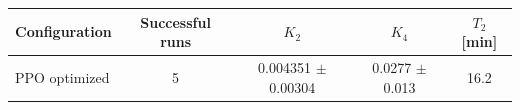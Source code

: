 \begin{tabular}{lcccc}
\toprule
Configuration & Successful runs & $K_2$ & $K_4$ & $T_2$ [min] \\
\midrule
PPO optimized & 5 & 0.004351 $\pm$ 0.00304 & 0.0277 $\pm$ 0.013 & 16.2 \\
\bottomrule
\end{tabular}
